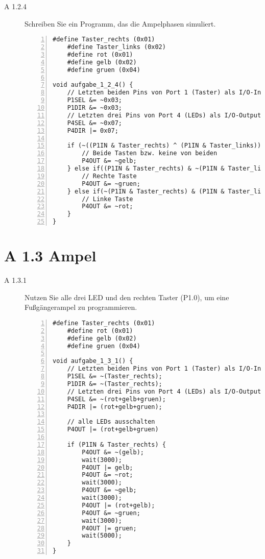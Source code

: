 \documentclass[11pt,a4paper,ngerman]{article}
\begin{document}
\begin{description}
	\item[A 1.2.4] Schreiben Sie ein Programm, das die Ampelphasen simuliert. \\
	
	\begin{lstlisting}[numbers=left]
	#define Taster_rechts (0x01)
	#define Taster_links (0x02)
	#define rot (0x01)
	#define gelb (0x02)
	#define gruen (0x04)
	
void aufgabe_1_2_4() {
	// Letzten beiden Pins von Port 1 (Taster) als I/O-Input verwenden
	P1SEL &= ~0x03;
	P1DIR &= ~0x03;
	// Letzten drei Pins von Port 4 (LEDs) als I/O-Output verwenden
	P4SEL &= ~0x07;
	P4DIR |= 0x07;
	
	if (~((P1IN & Taster_rechts) ^ (P1IN & Taster_links))) {
		// Beide Tasten bzw. keine von beiden
		P4OUT &= ~gelb;
	} else if((P1IN & Taster_rechts) & ~(P1IN & Taster_lins)) {
		// Rechte Taste
		P4OUT &= ~gruen;
	} else if(~(P1IN & Taster_rechts) & (P1IN & Taster_lins)) {
		// Linke Taste
		P4OUT &= ~rot;
	}
}
\end{lstlisting}

\end{description}

\section*{A 1.3 Ampel}
\begin{description}
\item[A 1.3.1] Nutzen Sie alle drei LED und den rechten Taster (P1.0), um eine Fußgängerampel zu programmieren. \\

\begin{lstlisting}[numbers=left]
	#define Taster_rechts (0x01)
	#define rot (0x01)
	#define gelb (0x02)
	#define gruen (0x04)
	
void aufgabe_1_3_1() {
	// Letzten beiden Pins von Port 1 (Taster) als I/O-Input verwenden
	P1SEL &= ~(Taster_rechts);
	P1DIR &= ~(Taster_rechts);
	// Letzten drei Pins von Port 4 (LEDs) als I/O-Output verwenden
	P4SEL &= ~(rot+gelb+gruen);
	P4DIR |= (rot+gelb+gruen);
	
	// alle LEDs ausschalten
	P4OUT |= (rot+gelb+gruen)
	
	if (P1IN & Taster_rechts) {
		P4OUT &= ~(gelb);
		wait(3000);
		P4OUT |= gelb;
		P4OUT &= ~rot;
		wait(3000);
		P4OUT &= ~gelb;
		wait(3000);
		P4OUT |= (rot+gelb);
		P4OUT &= ~gruen;
		wait(3000);
		P4OUT |= gruen;
		wait(5000);
	}
}
\end{lstlisting}
\end{description}
\end{document}
